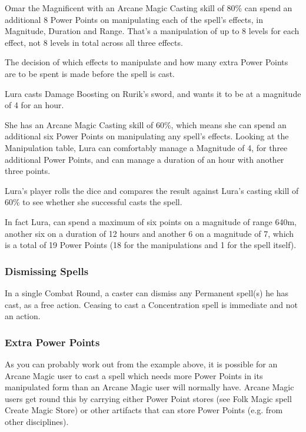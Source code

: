 \begin{rpg-examplebox}
Omar the Magnificent with an Arcane Magic Casting skill of 80\% can spend an additional 8 Power Points on manipulating each of the spell’s effects, in Magnitude, Duration and Range. That’s a manipulation of up to 8 levels for each effect, not 8 levels in total across all three effects.
\end{rpg-examplebox}

The decision of which effects to manipulate and how many extra Power Points are to be spent is made before the spell is cast.

\begin{rpg-examplebox}
Lura casts Damage Boosting on Rurik’s sword, and wants it to be at a magnitude of 4 for an hour.

She has an Arcane Magic Casting skill of 60\%, which means she can spend an additional six Power Points on manipulating any spell’s effects. Looking at the Manipulation table, Lura can comfortably manage a Magnitude of 4, for three additional Power Points, and can manage a duration of an hour with another three points. 

Lura’s player rolls the dice and compares the result against Lura’s casting skill of 60\% to see whether she successful casts the spell.

In fact Lura, can spend a maximum of six points on a magnitude of range 640m, another six on a duration of 12 hours and another 6 on a magnitude of 7, which is a total of 19 Power Points (18 for the manipulations and 1 for the spell itself).
\end{rpg-examplebox}


\subsubsection{Dismissing Spells}
In a single Combat Round, a caster can dismiss any Permanent spell(s) he has cast, as a free action. Ceasing to cast a Concentration spell is immediate and not an action. 


\subsubsection{Extra Power Points}
As you can probably work out from the example above, it is possible for an Arcane Magic user to cast a spell which needs more Power Points in its manipulated form than an Arcane Magic user will normally have. Arcane Magic users get round this by carrying either Power Point stores (see Folk Magic spell Create Magic Store) or other artifacts that can store Power Points (e.g. from other disciplines).


